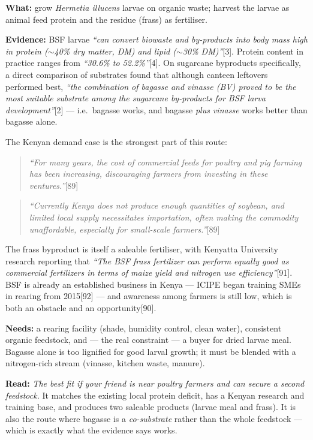\documentclass[11pt]{article}
\newcommand{\src}[1]{[#1]}
\begin{document}
\textbf{What:} grow \emph{Hermetia illucens} larvae on organic waste; harvest
the larvae as animal feed protein and the residue (frass) as fertiliser.

\textbf{Evidence:} BSF larvae \emph{``can convert biowaste and by-products into
body mass high in protein ($\sim$40\% dry matter, DM) and lipid ($\sim$30\%
DM)''}\src{3}. Protein content in practice ranges from \emph{``30.6\% to
52.2\%''}\src{4}. On sugarcane byproducts specifically, a direct comparison of
substrates found that although canteen leftovers performed best, \emph{``the
combination of bagasse and vinasse (BV) proved to be the most suitable
substrate among the sugarcane by-products for BSF larva development''}\src{2}
--- i.e.\ bagasse works, and bagasse \emph{plus vinasse} works better than
bagasse alone.

The Kenyan demand case is the strongest part of this route:

\begin{quote}
\emph{``For many years, the cost of commercial feeds for poultry and pig farming
has been increasing, discouraging farmers from investing in these
ventures.''}\src{89}
\end{quote}

\begin{quote}
\emph{``Currently Kenya does not produce enough quantities of soybean, and
limited local supply necessitates importation, often making the commodity
unaffordable, especially for small-scale farmers.''}\src{89}
\end{quote}

The frass byproduct is itself a saleable fertiliser, with Kenyatta University
research reporting that \emph{``The BSF frass fertilizer can perform equally
good as commercial fertilizers in terms of maize yield and nitrogen use
efficiency''}\src{91}. BSF is already an established business in Kenya ---
ICIPE began training SMEs in rearing from 2015\src{92} --- and awareness among
farmers is still low, which is both an obstacle and an opportunity\src{90}.

\textbf{Needs:} a rearing facility (shade, humidity control, clean water),
consistent organic feedstock, and --- the real constraint --- a buyer for dried
larvae meal. Bagasse alone is too lignified for good larval growth; it must be
blended with a nitrogen-rich stream (vinasse, kitchen waste, manure).

\textbf{Read:} \emph{The best fit if your friend is near poultry farmers and can
secure a second feedstock.} It matches the existing local protein deficit, has
a Kenyan research and training base, and produces two saleable products
(larvae meal and frass). It is also the route where bagasse is a
\emph{co-substrate} rather than the whole feedstock --- which is exactly what
the evidence says works.
\end{document}

